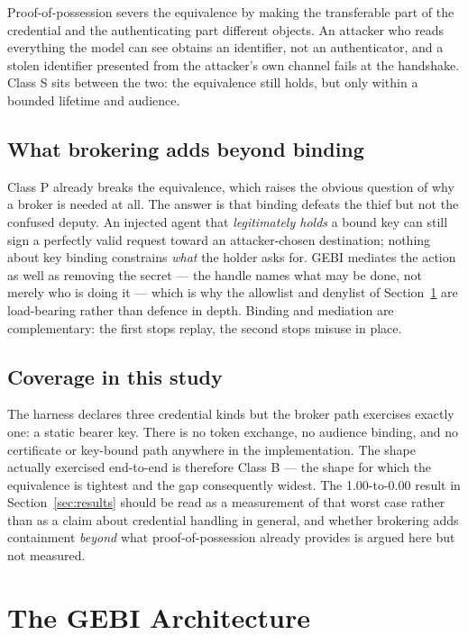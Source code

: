 \documentclass[conference]{IEEEtran}
\begin{document}
Proof-of-possession severs the equivalence by making the transferable part of
the credential and the authenticating part different objects. An attacker who
reads everything the model can see obtains an identifier, not an authenticator,
and a stolen identifier presented from the attacker's own channel fails at the
handshake. Class S sits between the two: the equivalence still holds, but only
within a bounded lifetime and audience.

\subsection{What brokering adds beyond binding}

Class P already breaks the equivalence, which raises the obvious question of why
a broker is needed at all. The answer is that binding defeats the thief but not
the confused deputy. An injected agent that \emph{legitimately holds} a bound
key can still sign a perfectly valid request toward an attacker-chosen
destination; nothing about key binding constrains \emph{what} the holder asks
for. GEBI mediates the action as well as removing the secret --- the handle
names what may be done, not merely who is doing it --- which is why the
allowlist and denylist of Section~\ref{sec:gebi} are load-bearing rather than
defence in depth. Binding and mediation are complementary: the first stops
replay, the second stops misuse in place.

\subsection{Coverage in this study}

The harness declares three credential kinds but the broker path exercises
exactly one: a static bearer key. There is no token exchange, no audience
binding, and no certificate or key-bound path anywhere in the implementation.
The shape actually exercised end-to-end is therefore Class B --- the shape for
which the equivalence is tightest and the gap consequently widest. The
1.00-to-0.00 result in Section~\ref{sec:results} should be read as a measurement
of that worst case rather than as a claim about credential handling in general,
and whether brokering adds containment \emph{beyond} what proof-of-possession
already provides is argued here but not measured.

\section{The GEBI Architecture}
\label{sec:gebi}
\end{document}
